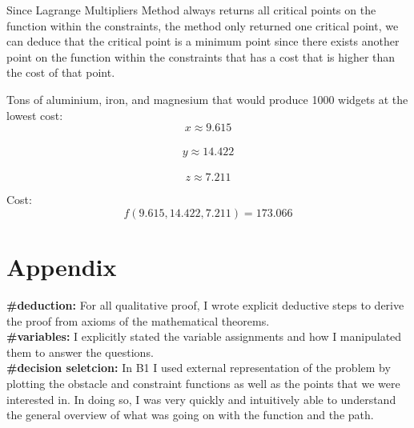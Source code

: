 \documentclass[11pt]{article}
\begin{document}
Since Lagrange Multipliers Method always returns all critical points on
the function within the constraints, the method only returned one
critical point, we can deduce that the critical point is a minimum point
since there exists another point on the function within the constraints
that has a cost that is higher than the cost of that point.

Tons of aluminium, iron, and magnesium that would produce 1000 widgets
at the lowest cost:\\
\[x \approx 9.615\]\\
\[y \approx 14.422\]\\
\[z \approx 7.211\]

Cost: \[f(9.615,14.422,7.211) = 173.066\]

    \section{Appendix}\label{appendix}

\textbf{\#deduction:} For all qualitative proof, I wrote explicit
deductive steps to derive the proof from axioms of the mathematical
theorems.\\
\textbf{\#variables:} I explicitly stated the variable assignments and
how I manipulated them to answer the questions.\\
\textbf{\#decision seletcion:} In B1 I used external representation of
the problem by plotting the obstacle and constraint functions as well as
the points that we were interested in. In doing so, I was very quickly
and intuitively able to understand the general overview of what was
going on with the function and the path.


    
    
    
    
\end{document}

